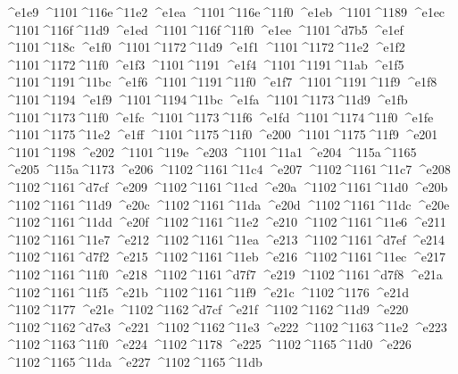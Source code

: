 \checkit ^^^^e1e9 ^^^^1101^^^^116e^^^^11e2
\checkit ^^^^e1ea ^^^^1101^^^^116e^^^^11f0
\checkit ^^^^e1eb ^^^^1101^^^^1189
\checkit ^^^^e1ec ^^^^1101^^^^116f^^^^11d9
\checkit ^^^^e1ed ^^^^1101^^^^116f^^^^11f0
\checkit ^^^^e1ee ^^^^1101^^^^d7b5
\checkit ^^^^e1ef ^^^^1101^^^^118c
\checkit ^^^^e1f0 ^^^^1101^^^^1172^^^^11d9
\checkit ^^^^e1f1 ^^^^1101^^^^1172^^^^11e2
\checkit ^^^^e1f2 ^^^^1101^^^^1172^^^^11f0
\checkit ^^^^e1f3 ^^^^1101^^^^1191
\checkit ^^^^e1f4 ^^^^1101^^^^1191^^^^11ab
\checkit ^^^^e1f5 ^^^^1101^^^^1191^^^^11bc
\checkit ^^^^e1f6 ^^^^1101^^^^1191^^^^11f0
\checkit ^^^^e1f7 ^^^^1101^^^^1191^^^^11f9
\checkit ^^^^e1f8 ^^^^1101^^^^1194
\checkit ^^^^e1f9 ^^^^1101^^^^1194^^^^11bc
\checkit ^^^^e1fa ^^^^1101^^^^1173^^^^11d9
\checkit ^^^^e1fb ^^^^1101^^^^1173^^^^11f0
\checkit ^^^^e1fc ^^^^1101^^^^1173^^^^11f6
\checkit ^^^^e1fd ^^^^1101^^^^1174^^^^11f0
\checkit ^^^^e1fe ^^^^1101^^^^1175^^^^11e2
\checkit ^^^^e1ff ^^^^1101^^^^1175^^^^11f0
\checkit ^^^^e200 ^^^^1101^^^^1175^^^^11f9
\checkit ^^^^e201 ^^^^1101^^^^1198
\checkit ^^^^e202 ^^^^1101^^^^119e
\checkit ^^^^e203 ^^^^1101^^^^11a1
\checkit ^^^^e204 ^^^^115a^^^^1165
\checkit ^^^^e205 ^^^^115a^^^^1173
\checkit ^^^^e206 ^^^^1102^^^^1161^^^^11c4
\checkit ^^^^e207 ^^^^1102^^^^1161^^^^11c7
\checkit ^^^^e208 ^^^^1102^^^^1161^^^^d7cf
\checkit ^^^^e209 ^^^^1102^^^^1161^^^^11cd
\checkit ^^^^e20a ^^^^1102^^^^1161^^^^11d0
\checkit ^^^^e20b ^^^^1102^^^^1161^^^^11d9
\checkit ^^^^e20c ^^^^1102^^^^1161^^^^11da
\checkit ^^^^e20d ^^^^1102^^^^1161^^^^11dc
\checkit ^^^^e20e ^^^^1102^^^^1161^^^^11dd
\checkit ^^^^e20f ^^^^1102^^^^1161^^^^11e2
\checkit ^^^^e210 ^^^^1102^^^^1161^^^^11e6
\checkit ^^^^e211 ^^^^1102^^^^1161^^^^11e7
\checkit ^^^^e212 ^^^^1102^^^^1161^^^^11ea
\checkit ^^^^e213 ^^^^1102^^^^1161^^^^d7ef
\checkit ^^^^e214 ^^^^1102^^^^1161^^^^d7f2
\checkit ^^^^e215 ^^^^1102^^^^1161^^^^11eb
\checkit ^^^^e216 ^^^^1102^^^^1161^^^^11ec
\checkit ^^^^e217 ^^^^1102^^^^1161^^^^11f0
\checkit ^^^^e218 ^^^^1102^^^^1161^^^^d7f7
\checkit ^^^^e219 ^^^^1102^^^^1161^^^^d7f8
\checkit ^^^^e21a ^^^^1102^^^^1161^^^^11f5
\checkit ^^^^e21b ^^^^1102^^^^1161^^^^11f9
\checkit ^^^^e21c ^^^^1102^^^^1176
\checkit ^^^^e21d ^^^^1102^^^^1177
\checkit ^^^^e21e ^^^^1102^^^^1162^^^^d7cf
\checkit ^^^^e21f ^^^^1102^^^^1162^^^^11d9
\checkit ^^^^e220 ^^^^1102^^^^1162^^^^d7e3
\checkit ^^^^e221 ^^^^1102^^^^1162^^^^11e3
\checkit ^^^^e222 ^^^^1102^^^^1163^^^^11e2
\checkit ^^^^e223 ^^^^1102^^^^1163^^^^11f0
\checkit ^^^^e224 ^^^^1102^^^^1178
\checkit ^^^^e225 ^^^^1102^^^^1165^^^^11d0
\checkit ^^^^e226 ^^^^1102^^^^1165^^^^11da
\checkit ^^^^e227 ^^^^1102^^^^1165^^^^11db

